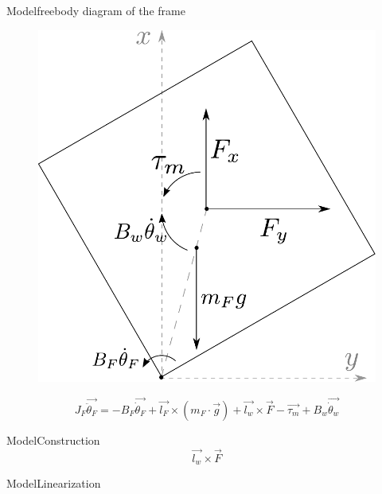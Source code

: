 \begin{frame}{Model}{freebody diagram of the frame}
	\begin{figure}[H]
		\includegraphics[scale=0.40]{Pictures/FreeBodyFrame.pdf}
	\end{figure}
	\begin{displaymath}
	\si{J_F \vec{\ddot{\theta}_F} =}
	\si{-B_F \vec{\dot{\theta}_F} + \vec{l_F} \times (m_F\cdot \vec{g}) + \vec{l_w} \times \vec{F} - \vec{\tau_m} + B_w \vec{\dot{\theta}_w}}
	\end{displaymath}
	
	
\end{frame}

\begin{frame}{Model}{Construction}
		\begin{displaymath}
		\si{\vec{l_w} \times \vec{F}}
		\end{displaymath}
		
\end{frame}

\begin{frame}{Model}{Linearization}
	\begin{figure}[H]
		\centering
	\end{figure}
\end{frame}

